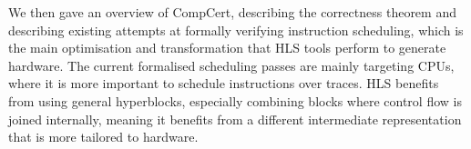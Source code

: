 We then gave an overview of CompCert, describing the correctness theorem and
describing existing attempts at formally verifying instruction scheduling, which
is the main optimisation and transformation that \gls{HLS} tools perform to
generate hardware.  The current formalised scheduling passes are mainly
targeting \glspl{CPU}, where it is more important to schedule instructions over
traces.  \gls{HLS} benefits from using general hyperblocks, especially combining
blocks where control flow is joined internally, meaning it benefits from a
different intermediate representation that is more tailored to hardware.

